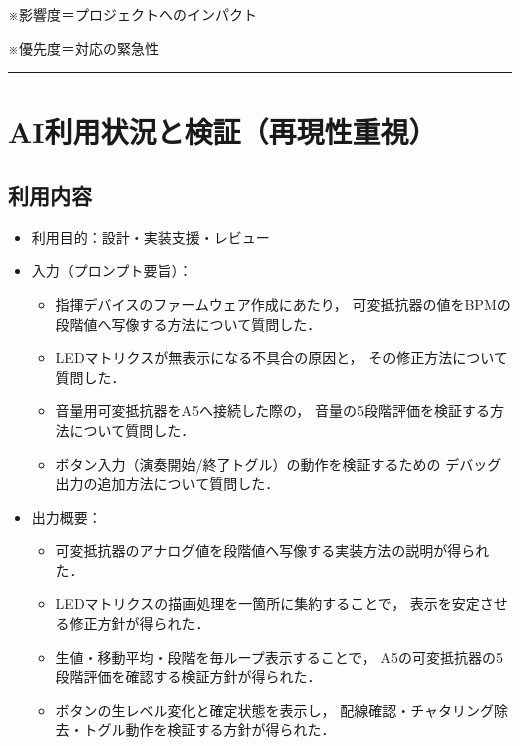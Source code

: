 \documentclass[uplatex,dvipdfmx,a4paper,11pt]{jsarticle}
\newcommand{\sectionrule}{\par\medskip\noindent\rule{\linewidth}{0.6pt}\par\medskip}
\begin{document}
\medskip
※影響度＝プロジェクトへのインパクト

※優先度＝対応の緊急性

\sectionrule


\section{AI利用状況と検証（再現性重視）}

\subsection{利用内容}

\begin{itemize}
  \item 利用目的：設計・実装支援・レビュー

  \item 入力（プロンプト要旨）：
    \begin{itemize}
      \item 指揮デバイスのファームウェア作成にあたり，
      可変抵抗器の値をBPMの段階値へ写像する方法について質問した．

      \item LEDマトリクスが無表示になる不具合の原因と，
      その修正方法について質問した．

      \item 音量用可変抵抗器をA5へ接続した際の，
      音量の5段階評価を検証する方法について質問した．

      \item ボタン入力（演奏開始/終了トグル）の動作を検証するための
      デバッグ出力の追加方法について質問した．
    \end{itemize}

  \item 出力概要：
    \begin{itemize}
      \item 可変抵抗器のアナログ値を段階値へ写像する実装方法の説明が得られた．

      \item LEDマトリクスの描画処理を一箇所に集約することで，
      表示を安定させる修正方針が得られた．

      \item 生値・移動平均・段階を毎ループ表示することで，
      A5の可変抵抗器の5段階評価を確認する検証方針が得られた．

      \item ボタンの生レベル変化と確定状態を表示し，
      配線確認・チャタリング除去・トグル動作を検証する方針が得られた．
    \end{itemize}
\end{itemize}
\end{document}
